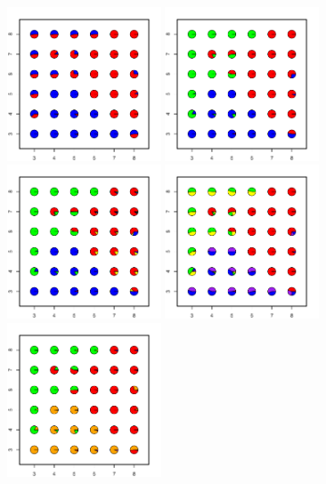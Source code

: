 \documentclass[12pt]{article}
\begin{document}
\begin{figure}
	\centering
			{\includegraphics[width=1.8in,height=1.8in]{figs/sims/simK3_nsp_pies_K2.pdf}}
			{\includegraphics[width=1.8in,height=1.8in]{figs/sims/simK3_nsp_pies_K3.pdf}}
			{\includegraphics[width=1.8in,height=1.8in]{figs/sims/simK3_nsp_pies_K4.pdf}}
			{\includegraphics[width=1.8in,height=1.8in]{figs/sims/simK3_nsp_pies_K5.pdf}}
			{\includegraphics[width=1.8in,height=1.8in]{figs/sims/simK3_nsp_pies_K6.pdf}}

\end{figure}
\end{document}
